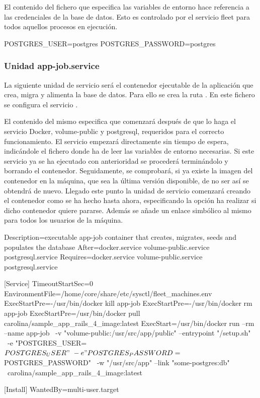 El contenido del fichero que especifica las variables de entorno hace referencia a las credenciales de la base de datos. Esto es controlado por el servicio fleet para todos aquellos procesos en ejecución.

\begin{codelisting}
\label{code:credentials}
\begin{code}
POSTGRES_USER=postgres
POSTGRES_PASSWORD=postgres
\end{code}
\end{codelisting}

\subsubsection{Unidad app-job.service}

La siguiente unidad de servicio será el contenedor ejecutable de la aplicación que crea, migra y alimenta la base de datos. Para ello se crea la ruta . En este fichero se configura el servicio .

El contenido del mismo especifica que comenzará después de que lo haga el servicio Docker, volume-public y postgresql, requeridos para el correcto funcionamiento. El servicio empezará directamente sin tiempo de espera, indicándole el fichero donde ha de leer las variables de entorno necesarias. Si este servicio ya se ha ejecutado con anterioridad se procederá terminándolo y borrando el contenedor. Seguidamente, se comprobará, si ya existe la imagen del contenedor en la máquina, que sea la última versión disponible, de no ser así se obtendrá de nuevo. Llegado este punto la unidad de servicio comenzará creando el contenedor como se ha hecho hasta ahora, especificando la opción ha realizar si dicho contenedor quiere pararse. Además se añade un enlace simbólico al mismo para todos los usuarios de la máquina. 

\begin{codelisting}
\label{code:app-job.service}
\begin{code}
[Unit] 
  Description=executable app-job container that creates, migrates, seeds and 
              populates the database
  After=docker.service volume-public.service postgresql.service
  Requires=docker.service volume-public.service postgresql.service

[Service] 
  TimeoutStartSec=0 
  EnvironmentFile=/home/core/share/etc/sysctl/fleet_machines.env
  ExecStartPre=-/usr/bin/docker kill app-job 
  ExecStartPre=-/usr/bin/docker rm app-job 
  ExecStartPre=/usr/bin/docker pull carolina/sample_app_rails_4_image:latest 
  ExecStart=/usr/bin/docker run --rm --name app-job \
  -v "volume-public:/usr/src/app/public" --entrypoint "/setup.sh" \
  -e "POSTGRES_USER=${POSTGRES_USER}" \
  -e "POSTGRES_PASSWORD=${POSTGRES_PASSWORD}" \
  -w "/usr/src/app" --link "some-postgres:db" \
  carolina/sample_app_rails_4_image:latest

[Install] 
  WantedBy=multi-user.target
\end{code}
\end{codelisting}

